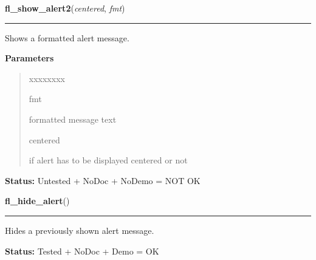     \label{xformslib:flgoodies:fl_show_alert2}

    \vspace{0.5ex}

\hspace{.8\funcindent}\begin{boxedminipage}{\funcwidth}

    \raggedright \textbf{fl\_show\_alert2}(\textit{centered}, \textit{fmt})

    \vspace{-1.5ex}

    \rule{\textwidth}{0.5\fboxrule}
\setlength{\parskip}{2ex}
    Shows a formatted alert message.

\setlength{\parskip}{1ex}
      \textbf{Parameters}
      \vspace{-1ex}

      \begin{quote}
        \begin{Ventry}{xxxxxxxx}

          \item[fmt]

          formatted message text

          \item[centered]

          if alert has to be displayed centered or not

        \end{Ventry}

      \end{quote}

\textbf{Status:} Untested + NoDoc + NoDemo = NOT OK



    \end{boxedminipage}

    \label{xformslib:flgoodies:fl_hide_alert}

    \vspace{0.5ex}

\hspace{.8\funcindent}\begin{boxedminipage}{\funcwidth}

    \raggedright \textbf{fl\_hide\_alert}()

    \vspace{-1.5ex}

    \rule{\textwidth}{0.5\fboxrule}
\setlength{\parskip}{2ex}
    Hides a previously shown alert message.

\setlength{\parskip}{1ex}
\textbf{Status:} Tested + NoDoc + Demo = OK



    \end{boxedminipage}

